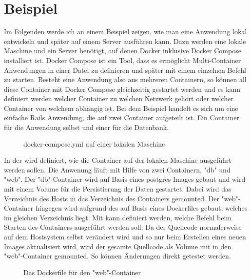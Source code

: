 \chapter{Beispiel}

Im Folgenden werde ich an einem Beispiel zeigen, wie man eine Anwendung lokal entwickeln und später auf einem Server ausführen kann. Dazu werden eine lokale Maschine und ein Server benötigt, auf denen Docker inklusive Docker Compose installiert ist. Docker Compose ist ein Tool, dass es ermöglicht Multi-Container Anwendungen in einer Datei zu definieren und später mit einem einzelnen Befehl zu starten. Besteht eine Anwendung also aus mehreren Containern, so können all diese Container mit Docker Compose gleichzeitig gestartet werden und es kann definiert werden welcher Container zu welchen Netzwerk gehört oder welcher Container von welchem abhängig ist. Bei dem Beispiel handelt es sich um eine einfache Rails Anwendung, die auf zwei Container aufgeteilt ist. Ein Container für die Anwendung selbst und einer für die Datenbank.\\

\begin{figure}[!ht]
  \centering
  \caption{docker-compose.yml auf einer lokalen Maschine}\label{figure:docker-compose development}
\end{figure}

\noindent In der  wird definiert, wie die Container auf der lokalen Maschine ausgeführt werden sollen. Die Anwenung läuft mit Hilfe von zwei Containern, "{}db"{} und "{}web"{}. Der "{}db"{}-Container wird auf Basis eines postgres Images gebaut und wird mit einem Volume für die Persistierung der Daten gestartet. Dabei wird das  Verzeichnis des Hosts in das  Verzeichnis des Containers gemounted. Der "{}web"{}-Container hingegen wird aufgrund des  auf Basis eines Dockerfiles gebaut, welches im gleichen Verzeichnis liegt. Mit  kann definiert werden, welche Befehl beim Starten des Containers ausgeführt werden soll. Da der Quellcode normalerweise auf dem Hostsystem selbst verändert wird und so nur beim Erstellen eines neuen Images aktualisiert wird, wird der gesamte Quellcode als Volume mit in den "{}web"{}-Container gemounted. So können Änderungen direkt getestet werden.

\begin{figure}[!ht]
  \centering
  \caption{Das Dockerfile für den "{}web"{}-Container}\label{figure:Dockerfile}
\end{figure}

